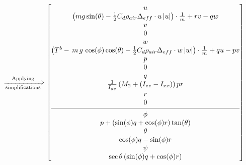 \begin{align}
\\\xRightarrow[\text{simplifications}]{\text{Applying}}
\begin{bmatrix}
u\\\left(mg\sin(\theta) -\frac{1}{2}C_d\rho_{air}\Delta_{eff}\cdot u\,\abs{u}\right)\cdot\frac{1}{m}+rv-qw\\
v\\0\\
w\\\left(T^b-\,m\,g\,\cos(\phi)\cos(\theta)-\frac{1}{2}C_d\rho_{air}\Delta_{eff}\cdot w\,\abs{w}\right)\cdot\frac{1}{m}+qu-pv\\
p\\0\\
q\\\frac{1}{I_{yy}}\left(M_2+\left(I_{zz}-I_{xx}\right)\right)pr\\
r\\0\\
\cmidrule(lr){1-1}
\phi\\p+\left(\sin(\phi)q+\cos(\phi)r\right)\tan(\theta)\\
\theta\\\cos(\phi)q-\sin(\phi)r\\
\psi\\\sec{\theta}\left(\sin(\phi)q+\cos(\phi)r\right)
\end{bmatrix}
\end{align}

